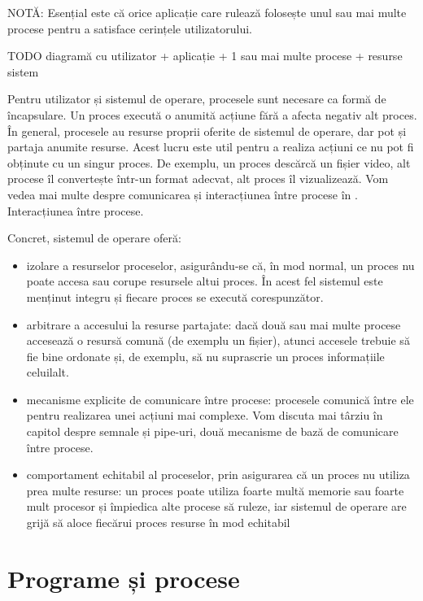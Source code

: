 NOTĂ: Esențial este că orice aplicație care rulează folosește unul sau mai multe procese pentru a satisface cerințele utilizatorului.

TODO diagramă cu utilizator + aplicație + 1 sau mai multe procese + resurse sistem

Pentru utilizator și sistemul de operare, procesele sunt necesare ca formă de
încapsulare. Un proces execută o anumită acțiune fără a afecta negativ alt
proces. În general, procesele au resurse proprii oferite de sistemul de operare,
dar pot și partaja anumite resurse. Acest lucru este util pentru a realiza
acțiuni ce nu pot fi obținute cu un singur proces. De exemplu, un proces
descărcă un fișier video, alt procese îl convertește într-un format adecvat, alt
proces îl vizualizează. Vom vedea mai multe despre comunicarea și interacțiunea
între procese în . Interacțiunea
între procese.

Concret, sistemul de operare oferă:

\begin{itemize}
	\item izolare a resurselor proceselor, asigurându-se că, în mod normal,
		un proces nu poate accesa sau corupe resursele altui proces. În
		acest fel sistemul este menținut integru și fiecare proces se
		execută corespunzător.
	\item arbitrare a accesului la resurse partajate: dacă două sau mai
		multe procese accesează o resursă comună (de exemplu un fișier),
		atunci accesele trebuie să fie bine ordonate și, de exemplu, să
		nu suprascrie un proces informațiile celuilalt.
	\item mecanisme explicite de comunicare între procese: procesele
		comunică între ele pentru realizarea unei acțiuni mai complexe.
		Vom discuta mai târziu în capitol despre semnale și pipe-uri,
		două mecanisme de bază de comunicare între procese.
	\item comportament echitabil al proceselor, prin asigurarea că un proces
		nu utiliza prea multe resurse: un proces poate utiliza foarte
		multă memorie sau foarte mult procesor și împiedica alte procese
		să ruleze, iar sistemul de operare are grijă să aloce fiecărui
		proces resurse în mod echitabil
\end{itemize}

\section{Programe și procese}
\label{sec:procese-v-programe}

